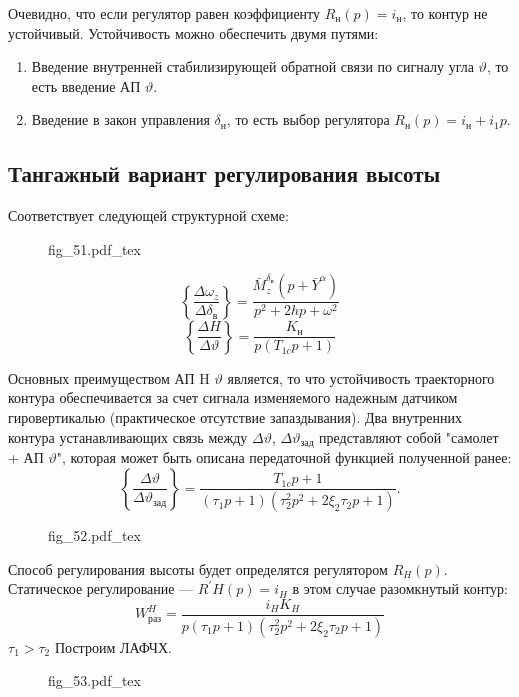 \documentclass{article}
\newcommand{\incfig}[1]{
    {#1.pdf_tex}
}
\begin{document}
Очевидно, что если регулятор равен коэффициенту $R_\text{н}(p)  = i_\text{н}$,
то контур не устойчивый.
Устойчивость можно обеспечить двумя путями:

\begin{enumerate}
    \item Введение внутренней стабилизирующей обратной связи по сигналу угла
        $\vartheta$, то есть введение АП $\vartheta$.
    \item Введение в закон управления $\delta_\text{н}$, то есть выбор
        регулятора $R_\text{н}(p) = i_\text{н} + i_1p$.
\end{enumerate}

\subsection{Тангажный вариант регулирования высоты}
Соответствует следующей структурной схеме:

\begin{figure}[H]
    \centering
    \incfig{fig_51}
    \label{fig:fig_51}
\end{figure}

\[
    \left\{\frac{\Delta \omega_z}{\Delta \delta_\text{в}} \right\} =
    \frac{\bar{M}_z^{\delta_\text{в}}(p + \bar{Y}^\alpha)}{p^2 + 2hp +
    \omega^2}
\]
\[
    \left\{ \frac{\Delta H}{\Delta \vartheta} \right\} =
    \frac{K_\text{н}}{p(T_{1c}p +1)}
\]

Основных преимуществом АП H $\vartheta$ является, то что устойчивость
траекторного контура обеспечивается за счет сигнала изменяемого надежным
датчиком гировертикалью (практическое отсутствие запаздывания). Два внутренних
контура устанавливающих связь между $\Delta \vartheta$, $\Delta
\vartheta_\text{зад}$ представляют собой "самолет + АП $\vartheta$", которая
может быть описана передаточной функцией полученной ранее:
\[
    \left\{\frac{\Delta \vartheta}{\Delta \vartheta_\text{зад}} \right\}
    =\frac{T_{1c}p + 1}{(\tau_1 p + 1) (\tau_2^2p^2 + 2 \xi_2 \tau_2 p + 1)}.
\]
\begin{figure}[H]
    \centering
    \incfig{fig_52}
    \label{fig:fig_52}
\end{figure}
Способ регулирования высоты будет определятся регулятором $R_H(p)$.
Статическое регулирование --- $R^{'}H(p) = i_H$ в этом случае разомкнутый
контур:
\[
    W_\text{раз}^H =\frac{i_H K_H}{p(\tau_1 p + 1)(\tau_2^2 p^2 + 2 \xi_2
    \tau_2 p + 1)}
\]
$\tau_1 > \tau_2$
Построим ЛАФЧХ.

\begin{figure}[H]
    \centering
    \incfig{fig_53}
    \label{fig:fig_53}
\end{figure}
\end{document}

